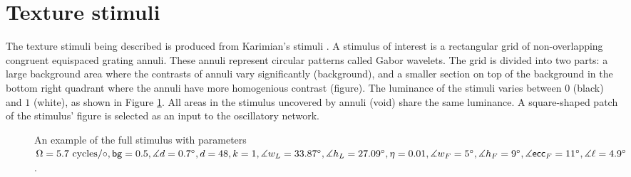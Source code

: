 \section{Texture stimuli}
\label{sec:external-stimuli}

The texture stimuli being described is produced from Karimian's stimuli \cite{MaryamPLACEHOLDER}. A stimulus of interest is a rectangular grid of non-overlapping congruent equispaced grating annuli. These annuli represent circular patterns called Gabor wavelets. The grid is divided into two parts: a large background area where the contrasts of annuli vary significantly (background), and a smaller section on top of the background in the bottom right quadrant where the annuli have more homogenious contrast (figure). The luminance of the stimuli varies between $0$ (black) and $1$ (white), as shown in Figure \ref{fig:full-stimulus-example}. All areas in the stimulus uncovered by annuli (void) share the same luminance. A square-shaped patch of the stimulus' figure is selected as an input to the oscillatory network.

\begin{figure}[!htp]
    \centering
    
    \caption[Full stimulus annotated]{An example of the full stimulus with parameters $ \Omega = 5.7 \text{ cycles}/\circ, \mathsf{bg} = 0.5, \measuredangle d = 0.7^\circ, d = 48, k = 1, \measuredangle w_L = 33.87^\circ, \measuredangle h_L = 27.09^\circ, \eta = 0.01, \measuredangle w_F = 5^\circ, \measuredangle h_F = 9^\circ, \measuredangle \mathsf{ecc}_F = 11^\circ, \measuredangle \ell = 4.9^\circ$.}
    \label{fig:full-stimulus-example}
\end{figure}



